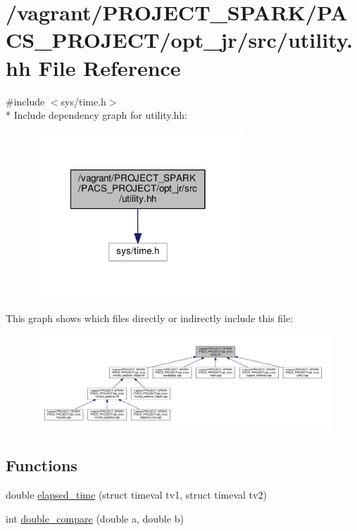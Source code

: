 \hypertarget{utility_8hh}{\section{/vagrant/\-P\-R\-O\-J\-E\-C\-T\-\_\-\-S\-P\-A\-R\-K/\-P\-A\-C\-S\-\_\-\-P\-R\-O\-J\-E\-C\-T/opt\-\_\-jr/src/utility.hh File Reference}
\label{utility_8hh}
}
{\ttfamily \#include $<$sys/time.\-h$>$}\\*
Include dependency graph for utility.\-hh\-:\nopagebreak
\begin{figure}[H]
\begin{center}
\leavevmode
\includegraphics[width=222pt]{utility_8hh__incl}
\end{center}
\end{figure}
This graph shows which files directly or indirectly include this file\-:
\nopagebreak
\begin{figure}[H]
\begin{center}
\leavevmode
\includegraphics[width=350pt]{utility_8hh__dep__incl}
\end{center}
\end{figure}
\subsection*{Functions}
\begin{DoxyCompactItemize}
\item 
double \hyperlink{utility_8hh_a8a6076c4dfa852d66ca966a95fe00601}{elapsed\-\_\-time} (struct timeval tv1, struct timeval tv2)
\item 
int \hyperlink{utility_8hh_af4db1a76cd28125bf2cbe22b82d65f8c}{double\-\_\-compare} (double a, double b)
\end{DoxyCompactItemize}
